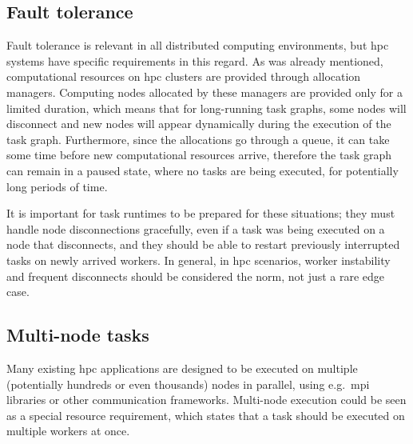 \subsection{Fault tolerance}
Fault tolerance is relevant in all distributed computing environments, but
\gls{hpc} systems have specific requirements in this regard. As was already
mentioned, computational resources on \gls{hpc} clusters are provided through
allocation managers. Computing nodes allocated by these managers are provided only for a limited
duration, which means that for long-running task graphs, some nodes will disconnect and new nodes
will appear dynamically during the execution of the task graph. Furthermore, since the allocations
go through a queue, it can take some time before new computational resources arrive, therefore the
task graph can remain in a paused state, where no tasks are being executed, for potentially long
periods of time.

It is important for task runtimes to be prepared for these situations; they must handle node
disconnections gracefully, even if a task was being executed on a node that disconnects, and they
should be able to restart previously interrupted tasks on newly arrived workers. In general, in
\gls{hpc} scenarios, worker instability and frequent disconnects should be
considered the norm, not just a rare edge case.

\subsection{Multi-node tasks}
Many existing \gls{hpc} applications are designed to be executed on multiple
(potentially hundreds or even thousands) nodes in parallel, using e.g.\ \gls{mpi}
libraries or other communication frameworks. Multi-node execution could be seen as a special
resource requirement, which states that a task should be executed on multiple workers at once.

